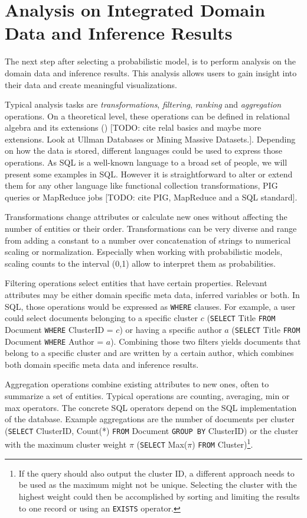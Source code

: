 \section{Analysis on Integrated Domain Data and Inference Results}

The next step after selecting a probabilistic model, is to perform analysis on the domain data and inference results. This analysis allows users to gain insight into their data and create meaningful visualizations.

Typical analysis tasks are \emph{transformations}, \emph{filtering}, \emph{ranking} and \emph{aggregation} operations. On a theoretical level, these operations can be defined in relational algebra and its extensions (\cite{ozsoyouglu1987extending, klug1982equivalence}) [TODO: cite relal basics and maybe more extensions. Look at Ullman Databases or Mining Massive Datasets.]. Depending on how the data is stored, different languages could be used to express those operations. As SQL is a well-known language to a broad set of people, we will present some examples in SQL. However it is straightforward to alter or extend them for any other language like functional collection transformations, PIG queries or MapReduce jobs [TODO: cite PIG, MapReduce and a SQL standard].

Transformations change attributes or calculate new ones without affecting the number of entities or their order. Transformations can be very diverse and range from adding a constant to a number over concatenation of strings to numerical scaling or normalization. Especially when working with probabilistic models, scaling counts to the interval (0,1) allow to interpret them as probabilities.

Filtering operations select entities that have certain properties. Relevant attributes may be either domain specific meta data, inferred variables or both. In SQL, those operations would be expressed as \texttt{WHERE} clauses. For example, a user could select documents belonging to a specific cluster $c$ (\texttt{SELECT} Title \texttt{FROM} Document \texttt{WHERE} ClusterID = $c$) or having a specific author $a$ (\texttt{SELECT} Title \texttt{FROM} Document \texttt{WHERE} Author = $a$). Combining those two filters yields documents that belong to a specific cluster and are written by a certain author, which combines both domain specific meta data and inference results.

Aggregation operations combine existing attributes to new ones, often to summarize a set of entities. Typical operations are counting, averaging, min or max operators. The concrete SQL operators depend on the SQL implementation of the database. Example aggregations are the number of documents per cluster (\texttt{SELECT} ClusterID, Count(*) \texttt{FROM} Document \texttt{GROUP BY} ClusterID) or the cluster with the maximum cluster weight $\pi$ (\texttt{SELECT} Max($\pi$) \texttt{FROM} Cluster)\footnote{If the query should also output the cluster ID, a different approach needs to be used as the maximum might not be unique. Selecting the cluster with the highest weight could then be accomplished by sorting and limiting the results to one record or using an \texttt{EXISTS} operator.}.

